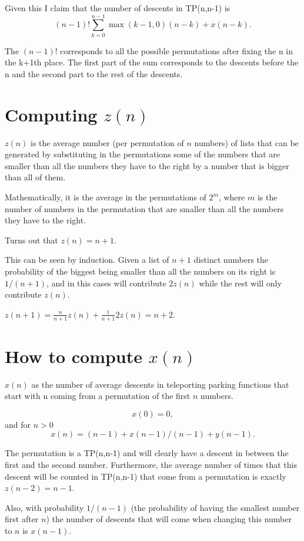 \documentclass{article}
\begin{document}
Given this I claim that the number of descents in TP(n,n-1) is 
\begin{equation}\label{total_descents}
    (n-1)!\sum_{k=0}^{n-1} \max(k-1,0)(n-k) + x(n-k).
\end{equation}

The $(n-1)!$ corresponds to all the possible permutations after fixing the n in the k+1th place. The first part of the sum corresponds to the descents before the n and the second part to the rest of the descents.

\section{Computing $z(n)$}

$z(n)$ is the average number (per permutation of $n$ numbers) of lists that can be generated by substituting in the permutations some of the numbers that are smaller than all the numbers they have to the right by a number that is bigger than all of them.

Mathematically, it is the average in the permutations of $2^m$, where $m$ is the number of numbers in the permutation that are smaller than all the numbers they have to the right.

Turns out that $z(n)=n+1$.

This can be seen by induction. Given a list of $n+1$ distinct numbers the probability of the biggest being smaller than all the numbers on its right is $1/(n+1)$, and in this cases will contribute $2z(n)$ while the rest will only contribute $z(n)$. 

$z(n+1)=\frac{n}{n+1}z(n)+\frac{1}{n+1}2z(n)=n+2$.


\section{How to compute $x(n)$}

$x(n)$ as the number of average descents in teleporting parking functions that start with n coming from a permutation of the first $n$ numbers.

$$x(0) = 0,$$
and for $n>0$
$$x(n)= (n-1) + x(n-1)/(n-1) + y(n-1).$$

The permutation is a TP(n,n-1) and will clearly have a descent in between the first and the second number. Furthermore, the average number of times that this descent will be counted in TP(n,n-1) that come from a permutation is exactly $z(n-2)=n-1$.

Also, with probability $1/(n-1)$ (the probability of having the smallest number first after $n$) the number of descents that will come when changing this number to $n$ is $x(n-1)$. 
\end{document}
